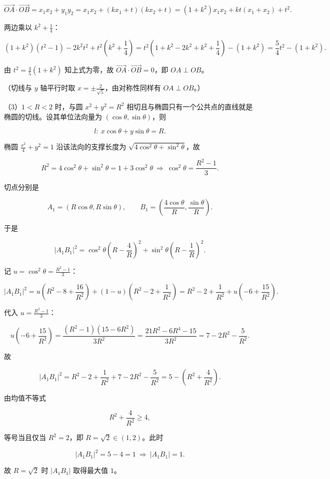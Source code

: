 \begin{answer}
\nopagebreak[4]
\[\overrightarrow{OA}\cdot\overrightarrow{OB}=x_1x_2+y_1y_2
=x_1x_2+(kx_1+t)(kx_2+t)
=(1+k^2)x_1x_2+kt(x_1+x_2)+t^2 .\]

两边乘以 $k^2+\frac14$：

\nopagebreak[4]
\[(1+k^2)(t^2-1)-2k^2t^2+t^2\left(k^2+\frac14\right)
=t^2\left(1+k^2-2k^2+k^2+\frac14\right)-(1+k^2)
=\frac54t^2-(1+k^2).\]

由 $t^2=\frac45(1+k^2)$ 知上式为零，故 $\overrightarrow{OA}\cdot\overrightarrow{OB}=0$，即 $OA\perp OB$。

（切线与 $y$ 轴平行时取 $x=\pm\frac2{\sqrt5}$，由对称性同样有 $OA\perp OB$。）

（3）$1<R<2$ 时，与圆 $x^2+y^2=R^2$ 相切且与椭圆只有一个公共点的直线就是椭圆的切线。设其单位法向量为 $(\cos\theta,\sin\theta)$，则

\nopagebreak[4]
\[l:\ x\cos\theta+y\sin\theta=R .\]

椭圆 $\frac{x^2}{4}+y^2=1$ 沿该法向的支撑长度为 $\sqrt{4\cos^2\theta+\sin^2\theta}$，故

\nopagebreak[4]
\[R^2=4\cos^2\theta+\sin^2\theta=1+3\cos^2\theta\ \Longrightarrow\ \cos^2\theta=\frac{R^2-1}{3}.\]

切点分别是

\nopagebreak[4]
\[A_1=(R\cos\theta,R\sin\theta),\qquad B_1=\left(\frac{4\cos\theta}{R},\frac{\sin\theta}{R}\right).\]

于是

\nopagebreak[4]
\[|A_1B_1|^2=\cos^2\theta\left(R-\frac4R\right)^2+\sin^2\theta\left(R-\frac1R\right)^2 .\]

记 $u=\cos^2\theta=\frac{R^2-1}{3}$：

\nopagebreak[4]
\[|A_1B_1|^2=u\left(R^2-8+\frac{16}{R^2}\right)+(1-u)\left(R^2-2+\frac1{R^2}\right)
=R^2-2+\frac1{R^2}+u\left(-6+\frac{15}{R^2}\right).\]

代入 $u=\frac{R^2-1}{3}$：

\nopagebreak[4]
\[u\left(-6+\frac{15}{R^2}\right)=\frac{(R^2-1)(15-6R^2)}{3R^2}
=\frac{21R^2-6R^4-15}{3R^2}=7-2R^2-\frac5{R^2}.\]

故

\nopagebreak[4]
\[|A_1B_1|^2=R^2-2+\frac1{R^2}+7-2R^2-\frac5{R^2}=5-\left(R^2+\frac4{R^2}\right).\]

由均值不等式

\nopagebreak[4]
\[R^2+\frac4{R^2}\geqslant4,\]

等号当且仅当 $R^2=2$，即 $R=\sqrt2\in(1,2)$。此时

\nopagebreak[4]
\[|A_1B_1|^2=5-4=1\ \Longrightarrow\ |A_1B_1|=1 .\]

故 $R=\sqrt2$ 时 $|A_1B_1|$ 取得最大值 $1$。


\end{answer}